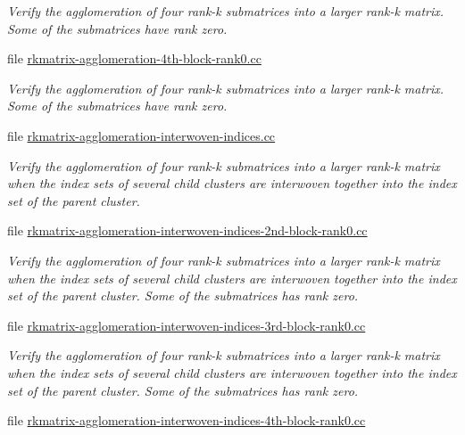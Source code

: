 \begin{DoxyCompactItemize}
\begin{DoxyCompactList}\small\item\em Verify the agglomeration of four rank-\/k submatrices into a larger rank-\/k matrix. Some of the submatrices have rank zero. \end{DoxyCompactList}\item 
file \hyperlink{rkmatrix-agglomeration-4th-block-rank0_8cc}{rkmatrix-\/agglomeration-\/4th-\/block-\/rank0.\+cc}
\begin{DoxyCompactList}\small\item\em Verify the agglomeration of four rank-\/k submatrices into a larger rank-\/k matrix. Some of the submatrices have rank zero. \end{DoxyCompactList}\item 
file \hyperlink{rkmatrix-agglomeration-interwoven-indices_8cc}{rkmatrix-\/agglomeration-\/interwoven-\/indices.\+cc}
\begin{DoxyCompactList}\small\item\em Verify the agglomeration of four rank-\/k submatrices into a larger rank-\/k matrix when the index sets of several child clusters are interwoven together into the index set of the parent cluster. \end{DoxyCompactList}\item 
file \hyperlink{rkmatrix-agglomeration-interwoven-indices-2nd-block-rank0_8cc}{rkmatrix-\/agglomeration-\/interwoven-\/indices-\/2nd-\/block-\/rank0.\+cc}
\begin{DoxyCompactList}\small\item\em Verify the agglomeration of four rank-\/k submatrices into a larger rank-\/k matrix when the index sets of several child clusters are interwoven together into the index set of the parent cluster. Some of the submatrices has rank zero. \end{DoxyCompactList}\item 
file \hyperlink{rkmatrix-agglomeration-interwoven-indices-3rd-block-rank0_8cc}{rkmatrix-\/agglomeration-\/interwoven-\/indices-\/3rd-\/block-\/rank0.\+cc}
\begin{DoxyCompactList}\small\item\em Verify the agglomeration of four rank-\/k submatrices into a larger rank-\/k matrix when the index sets of several child clusters are interwoven together into the index set of the parent cluster. Some of the submatrices has rank zero. \end{DoxyCompactList}\item 
file \hyperlink{rkmatrix-agglomeration-interwoven-indices-4th-block-rank0_8cc}{rkmatrix-\/agglomeration-\/interwoven-\/indices-\/4th-\/block-\/rank0.\+cc}

\end{DoxyCompactItemize}
